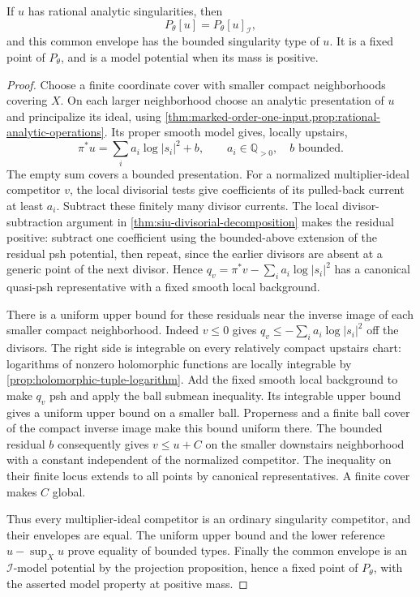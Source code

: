 \begin{proposition}\label{prop:analytic-singularity-envelope-equality}
If $u$ has rational analytic singularities, then
\[
 P_\theta[u]=P_\theta[u]_{\mathcal I},
\]
and this common envelope has the bounded singularity type of $u$. It is a fixed point of $P_\theta$, and is a model potential when its mass is positive.
\end{proposition}
\begin{proof}
Choose a finite coordinate cover with smaller compact neighborhoods covering $X$. On each larger neighborhood choose an analytic presentation of $u$ and principalize its ideal, using \cref{thm:marked-order-one-input,prop:rational-analytic-operations}. Its proper smooth model gives, locally upstairs,
\[
 \pi^*u=\sum_i a_i\log|s_i|^2+b,
 \qquad a_i\in\mathbb Q_{>0},\quad b\text{ bounded}.
\]
The empty sum covers a bounded presentation. For a normalized multiplier-ideal competitor $v$, the local divisorial tests give coefficients of its pulled-back current at least $a_i$. Subtract these finitely many divisor currents. The local divisor-subtraction argument in \cref{thm:siu-divisorial-decomposition} makes the residual positive: subtract one coefficient using the bounded-above extension of the residual psh potential, then repeat, since the earlier divisors are absent at a generic point of the next divisor. Hence
$q_v=\pi^*v-\sum_i a_i\log|s_i|^2$ has a canonical quasi-psh representative with a fixed smooth local background.

There is a uniform upper bound for these residuals near the inverse image of each smaller compact neighborhood. Indeed $v\leq0$ gives $q_v\leq-\sum_i a_i\log|s_i|^2$ off the divisors. The right side is integrable on every relatively compact upstairs chart: logarithms of nonzero holomorphic functions are locally integrable by \cref{prop:holomorphic-tuple-logarithm}. Add the fixed smooth local background to make $q_v$ psh and apply the ball submean inequality. Its integrable upper bound gives a uniform upper bound on a smaller ball. Properness and a finite ball cover of the compact inverse image make this bound uniform there. The bounded residual $b$ consequently gives $v\leq u+C$ on the smaller downstairs neighborhood with a constant independent of the normalized competitor. The inequality on their finite locus extends to all points by canonical representatives. A finite cover makes $C$ global.

Thus every multiplier-ideal competitor is an ordinary singularity competitor, and their envelopes are equal. The uniform upper bound and the lower reference $u-\sup_Xu$ prove equality of bounded types. Finally the common envelope is an $\mathcal I$-model potential by the projection proposition, hence a fixed point of $P_\theta$, with the asserted model property at positive mass.
\end{proof}

